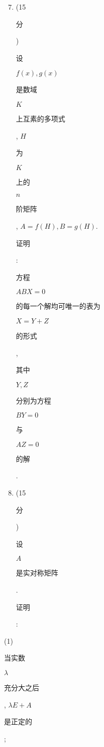 \documentclass[10pt]{article}
\begin{document}
\begin{enumerate}
  \setcounter{enumi}{6}
  \item (15 \begin{CJK}{UTF8}{mj}分\end{CJK}) \begin{CJK}{UTF8}{mj}设\end{CJK} $f(x), g(x)$ \begin{CJK}{UTF8}{mj}是数域\end{CJK} $K$ \begin{CJK}{UTF8}{mj}上互素的多项式\end{CJK}, $H$ \begin{CJK}{UTF8}{mj}为\end{CJK} $K$ \begin{CJK}{UTF8}{mj}上的\end{CJK} $n$ \begin{CJK}{UTF8}{mj}阶矩阵\end{CJK}, $A=f(H), B=g(H)$. \begin{CJK}{UTF8}{mj}证明\end{CJK}: \begin{CJK}{UTF8}{mj}方程\end{CJK} $A B X=0$ \begin{CJK}{UTF8}{mj}的每一个解均可唯一的表为\end{CJK} $X=Y+Z$ \begin{CJK}{UTF8}{mj}的形式\end{CJK},\begin{CJK}{UTF8}{mj}其中\end{CJK} $Y, Z$ \begin{CJK}{UTF8}{mj}分别为方程\end{CJK} $B Y=0$ \begin{CJK}{UTF8}{mj}与\end{CJK} $A Z=0$ \begin{CJK}{UTF8}{mj}的解\end{CJK}.

  \item (15 \begin{CJK}{UTF8}{mj}分\end{CJK}) \begin{CJK}{UTF8}{mj}设\end{CJK} $A$ \begin{CJK}{UTF8}{mj}是实对称矩阵\end{CJK}. \begin{CJK}{UTF8}{mj}证明\end{CJK}:

\end{enumerate}
(1)\begin{CJK}{UTF8}{mj}当实数\end{CJK} $\lambda$ \begin{CJK}{UTF8}{mj}充分大之后\end{CJK}, $\lambda E+A$ \begin{CJK}{UTF8}{mj}是正定的\end{CJK};
\end{document}

